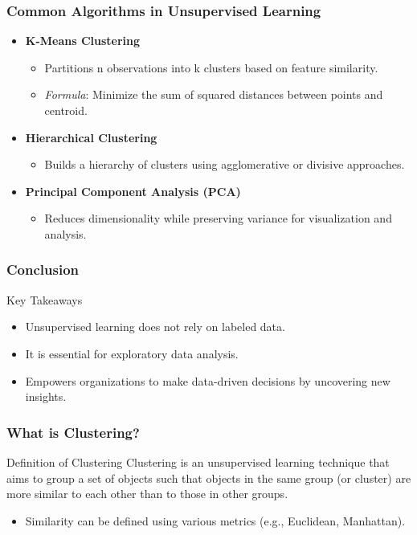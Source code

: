 \documentclass{beamer}
\begin{document}
\begin{frame}[fragile]
    \frametitle{Common Algorithms in Unsupervised Learning}
    \begin{itemize}
        \item \textbf{K-Means Clustering}
            \begin{itemize}
                \item Partitions n observations into k clusters based on feature similarity.
                \item \textit{Formula}: Minimize the sum of squared distances between points and centroid.
            \end{itemize}
        \item \textbf{Hierarchical Clustering}
            \begin{itemize}
                \item Builds a hierarchy of clusters using agglomerative or divisive approaches.
            \end{itemize}
        \item \textbf{Principal Component Analysis (PCA)}
            \begin{itemize}
                \item Reduces dimensionality while preserving variance for visualization and analysis.
            \end{itemize}
    \end{itemize}
\end{frame}

\begin{frame}[fragile]
    \frametitle{Conclusion}
    \begin{block}{Key Takeaways}
        \begin{itemize}
            \item Unsupervised learning does not rely on labeled data.
            \item It is essential for exploratory data analysis.
            \item Empowers organizations to make data-driven decisions by uncovering new insights.
        \end{itemize}
    \end{block}
\end{frame}

\begin{frame}[fragile]
    \frametitle{What is Clustering?}
    \begin{block}{Definition of Clustering}
        Clustering is an unsupervised learning technique that aims to group a set of objects such that objects in the same group (or cluster) are more similar to each other than to those in other groups.
    \end{block}
    
    \begin{itemize}
        \item Similarity can be defined using various metrics (e.g., Euclidean, Manhattan).
    \end{itemize}
\end{frame}
\end{document}
